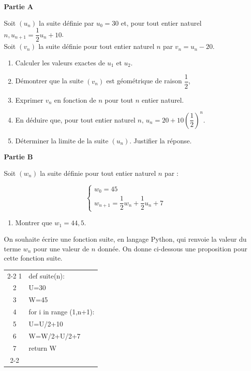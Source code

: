 \medskip

\textbf{Partie A}

\medskip

Soit $\left(u_{n}\right)$ la suite définie par $u_{0}=30$ et, pour tout entier naturel $n, u_{n+1}=\dfrac{1}{2} u_{n}+10$.\\
Soit $\left(v_{n}\right)$ la suite définie pour tout entier naturel $n$ par $v_{n}=u_{n}-20$.

\begin{enumerate}
\item Calculer les valeurs exactes de $u_{1}$ et $u_{2}$.
\item Démontrer que la suite $\left(v_{n}\right)$ est géométrique de raison $\dfrac12$,
\item Exprimer $v_{n}$ en fonction de $n$ pour tout $n$ entier naturel.
\item En déduire que, pour tout entier naturel $n,\,  u_{n}=20+10\left(\dfrac{1}{2}\right)^{n}$.
\item Déterminer la limite de la suite $\left(u_{n}\right)$. Justifier la réponse.
\end{enumerate}

\textbf{Partie B}

\medskip

Soit $\left(w_{n}\right)$ la suite définie pour tout entier naturel $n$ par :

\[
\begin{cases}
w_{0}=45 \\
w_{n+1}=\dfrac{1}{2} w_{n}+\dfrac{1}{2} u_{n}+7
\end{cases}
\]

\begin{enumerate}
\item Montrer que $w_{1} = 44,5$.
\end{enumerate}

On souhaite écrire une fonction suite, en langage Python, qui renvoie la valeur du terme $w_{n}$ pour une valeur de $n$ donnée. On donne ci-dessous une proposition pour cette fonction suite.

\begin{center}

\begin{tabular}{c| l|}\cline{2-2}
1&def suite(n):\\
2&\quad U=30\\
3&\quad W=45\\
4&\quad for i in range (1,n+1):\\
5&\quad\quad   U=U/2+10\\
6&\quad\quad  W=W/2+U/2+7\\
7&\quad return W\\ \cline{2-2}

\end{tabular}
\end{center}

